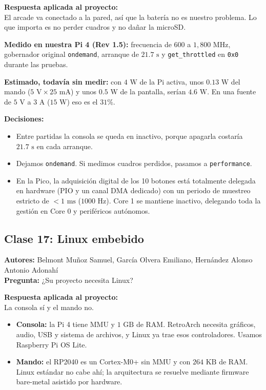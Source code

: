 \documentclass[conference]{IEEEtran}
\begin{document}
\textbf{Respuesta aplicada al proyecto:} \\
El arcade va conectado a la pared, así que la batería no es nuestro problema. Lo que importa es no perder cuadros y no dañar la microSD.

\textbf{Medido en nuestra Pi 4 (Rev 1.5):} frecuencia de $600$ a $1{,}800\text{ MHz}$, gobernador original \texttt{ondemand}, arranque de $21.7\text{ s}$ y \texttt{get\_throttled} en \texttt{0x0} durante las pruebas.

\textbf{Estimado, todavía sin medir:} con $4\text{ W}$ de la Pi activa, unos $0.13\text{ W}$ del mando ($5\text{ V} \times 25\text{ mA}$) y unos $0.5\text{ W}$ de la pantalla, serían $4.6\text{ W}$. En una fuente de $5\text{ V}$ a $3\text{ A}$ ($15\text{ W}$) eso es el $31\%$.

\textbf{Decisiones:}
\begin{itemize}
    \item Entre partidas la consola se queda en inactivo, porque apagarla costaría $21.7\text{ s}$ en cada arranque.
    \item Dejamos \texttt{ondemand}. Si medimos cuadros perdidos, pasamos a \texttt{performance}.
    \item En la Pico, la adquisición digital de los 10 botones está totalmente delegada en hardware (PIO y un canal DMA dedicado) con un periodo de muestreo estricto de $<1\text{ ms}$ ($1000\text{ Hz}$). Core 1 se mantiene inactivo, delegando toda la gestión en Core 0 y periféricos autónomos.
\end{itemize}

\subsection{Clase 17: Linux embebido}
\textbf{Autores:} Belmont Muñoz Samuel, García Olvera Emiliano, Hernández Alonso Antonio Adonahí \\
\textbf{Pregunta:} ¿Su proyecto necesita Linux?

\textbf{Respuesta aplicada al proyecto:} \\
La consola sí y el mando no.

\begin{itemize}
    \item \textbf{Consola:} la Pi 4 tiene MMU y $1\text{ GB}$ de RAM. RetroArch necesita gráficos, audio, USB y sistema de archivos, y Linux ya trae esos controladores. Usamos Raspberry Pi OS Lite.
    \item \textbf{Mando:} el RP2040 es un Cortex-M0+ sin MMU y con $264\text{ KB}$ de RAM. Linux estándar no cabe ahí; la arquitectura se resuelve mediante firmware bare-metal asistido por hardware.
\end{itemize}
\end{document}
